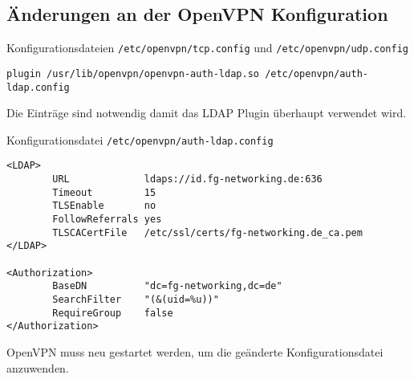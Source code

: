 \subsection{Änderungen an der OpenVPN Konfiguration}\label{sec:VPN-Konfig}
Konfigurationsdateien \texttt{/etc/openvpn/tcp.config} und \texttt{/etc/openvpn/udp.config}
\begin{lstlisting}
plugin /usr/lib/openvpn/openvpn-auth-ldap.so /etc/openvpn/auth-ldap.config
\end{lstlisting}
Die Einträge sind notwendig damit das LDAP Plugin überhaupt verwendet wird.

Konfigurationsdatei \texttt{/etc/openvpn/auth-ldap.config}
\begin{lstlisting}
<LDAP>
        URL             ldaps://id.fg-networking.de:636
        Timeout         15
        TLSEnable       no
        FollowReferrals yes
        TLSCACertFile   /etc/ssl/certs/fg-networking.de_ca.pem
</LDAP>

<Authorization>
        BaseDN          "dc=fg-networking,dc=de"
        SearchFilter    "(&(uid=%u))"
        RequireGroup    false
</Authorization>
\end{lstlisting}
OpenVPN muss neu gestartet werden, um die geänderte Konfigurationsdatei anzuwenden.

